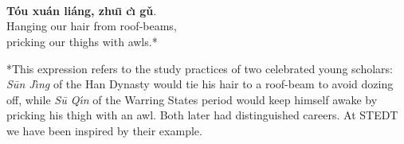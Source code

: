 \onecolumn
\section*{}

\hfill
\hfill
\begin{minipage}[c]{0.3\linewidth}
\\
\textbf{Tóu xuán liáng, zhuı̄ cı̀ gǔ}.\\
Hanging our hair from roof-beams,\\
pricking our thighs with awls.*
\end{minipage}
\hfill
\hfill

\bigskip

\bigskip

\bigskip

\bigskip

\hfill
\begin{minipage}[c]{0.3\linewidth}
*This expression refers to the study practices of two celebrated young scholars: \textit{Sūn Jı̀ng}  of the Han Dynasty would tie his hair to a roof-beam to avoid dozing off, while \textit{Sū Qı́n}  of the Warring States period would keep himself awake by pricking his thigh with an awl. Both later had distinguished careers. At STEDT we have been inspired by their example.
\end{minipage}
\hfill
\hfill

\twocolumn